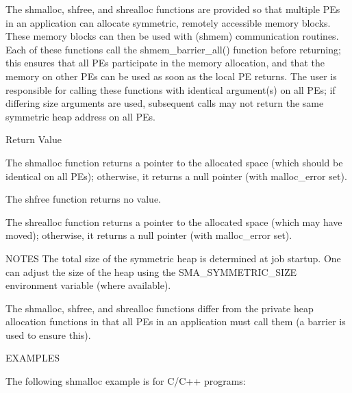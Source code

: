        The shmalloc, shfree, and shrealloc  functions  are  provided  so  that
       multiple	 PEs  in  an  application  can	allocate  symmetric,  remotely
       accessible memory blocks.  These memory blocks can then	be  used  with
       (shmem)	communication  routines.   Each	 of  these  functions call the
       shmem_barrier_all() function before returning; this ensures  that  all
       PEs  participate in the memory allocation, and that the memory on other
       PEs can be used	as  soon  as  the  local  PE  returns.	 The  user  is
       responsible  for	 calling these functions with identical argument(s) on
       all PEs; if differing size arguments are used, subsequent calls may not
       return the same symmetric heap address on all PEs.

Return Value

       The shmalloc function returns a pointer to the allocated	 space	(which
       should  be  identical on all PEs); otherwise, it returns a null pointer
       (with malloc_error set).

       The shfree function returns no value.

       The shrealloc function returns a pointer to the allocated space	(which
       may   have   moved);   otherwise,  it  returns  a  null	pointer	 (with
       malloc_error set).

NOTES
       The total size of the symmetric heap is determined at job startup.  One
       can  adjust  the	 size  of  the	heap  using   the   SMA_SYMMETRIC_SIZE
       environment  variable (where available).	

       The shmalloc, shfree, and shrealloc functions differ from  the  private
       heap  allocation	 functions in that all PEs in an application must call
       them (a barrier is used to ensure this).


EXAMPLES
 
       The following shmalloc example is for C/C++ programs:

       
